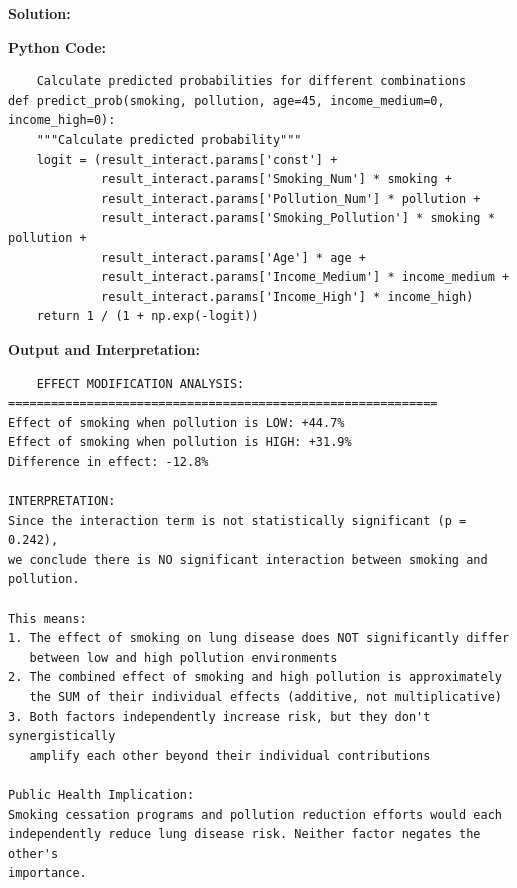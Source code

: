 \documentclass[12pt]{article}
\begin{document}
{\large\textbf{Solution:}}

\vspace{0.1cm}

{\large\textbf{Python Code:}}
\begin{verbatim}
    Calculate predicted probabilities for different combinations
def predict_prob(smoking, pollution, age=45, income_medium=0, income_high=0):
    """Calculate predicted probability"""
    logit = (result_interact.params['const'] + 
             result_interact.params['Smoking_Num'] * smoking +
             result_interact.params['Pollution_Num'] * pollution +
             result_interact.params['Smoking_Pollution'] * smoking * pollution +
             result_interact.params['Age'] * age +
             result_interact.params['Income_Medium'] * income_medium +
             result_interact.params['Income_High'] * income_high)
    return 1 / (1 + np.exp(-logit))
\end{verbatim}
\vspace{0.1cm}

\textbf{Output and Interpretation:}

\vspace{0.4cm}
\begin{verbatim}
    EFFECT MODIFICATION ANALYSIS:
============================================================
Effect of smoking when pollution is LOW: +44.7%
Effect of smoking when pollution is HIGH: +31.9%
Difference in effect: -12.8%

INTERPRETATION:
Since the interaction term is not statistically significant (p = 0.242), 
we conclude there is NO significant interaction between smoking and pollution.

This means:
1. The effect of smoking on lung disease does NOT significantly differ 
   between low and high pollution environments
2. The combined effect of smoking and high pollution is approximately 
   the SUM of their individual effects (additive, not multiplicative)
3. Both factors independently increase risk, but they don't synergistically 
   amplify each other beyond their individual contributions

Public Health Implication: 
Smoking cessation programs and pollution reduction efforts would each 
independently reduce lung disease risk. Neither factor negates the other's 
importance.

\end{verbatim}

\vspace{0.3cm}
\end{document}
